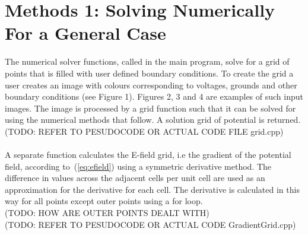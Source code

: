 \documentclass{article}
\begin{document}
\section{Methods 1: Solving Numerically For a General Case}
 The numerical solver functions, called in the main program, solve for a grid of points that is filled with user defined boundary conditions. To create the grid a user creates an image with colours corresponding to voltages, grounds and other boundary conditions (see Figure 1). Figures 2, 3 and 4 are examples of such input images. The image is processed by a grid function such that it can be solved for using the numerical methods that follow. A solution grid of potential is returned. \\
(TODO: REFER TO PESUDOCODE OR ACTUAL CODE FILE grid.cpp) \\ 
\\
A separate function calculates the E-field grid, i.e the gradient of the potential field, according to~(\ref{eq:efield}) using a symmetric derivative method. The difference in values across the adjacent cells per unit cell are used as an approximation for the derivative for each cell. The derivative is calculated in this way for all points except outer points using a for loop.\\
(TODO: HOW ARE OUTER POINTS DEALT WITH)
\\
(TODO: REFER TO PESUDOCODE OR ACTUAL CODE GradientGrid.cpp) \\
 \\
\\
\end{document}
